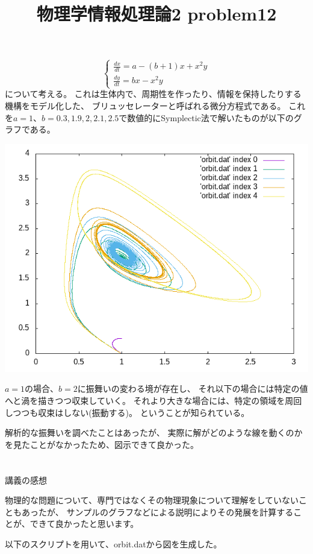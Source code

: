 \documentclass[12pt,a5]{bxjsarticle}
\title{物理学情報処理論2 problem12}
\date{}
\begin{document}
\maketitle

\section{}

\[
  \begin{cases}
    \frac{dx}{dt} = a - (b + 1) x + x^2 y \\
    \frac{dy}{dt} = bx - x^2 y
  \end{cases}
\]
について考える。
これは生体内で、周期性を作ったり、情報を保持したりする機構をモデル化した、
ブリュッセレーターと呼ばれる微分方程式である。
これを$ a = 1 $、$ b = 0.3, 1.9, 2, 2.1, 2.5 $で数値的にSymplectic法で解いたものが以下のグラフである。

\includegraphics[width=\linewidth]{orbit.png}

$ a = 1 $の場合、$ b = 2 $に振舞いの変わる境が存在し、
それ以下の場合には特定の値へと渦を描きつつ収束していく。
それより大きな場合には、特定の領域を周回しつつも収束はしない(振動する)。
ということが知られている。

解析的な振舞いを調べたことはあったが、
実際に解がどのような線を動くのかを見たことがなかったため、図示できて良かった。

\section{}
講義の感想

物理的な問題について、専門ではなくその物理現象について理解をしていないこともあったが、
サンプルのグラフなどによる説明によりその発展を計算することが、できて良かったと思います。

以下のスクリプトを用いて、orbit.datから図を生成した。

\end{document}
